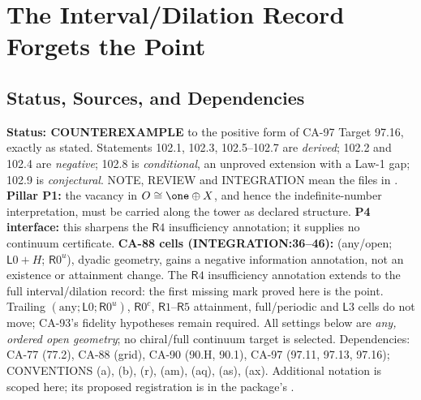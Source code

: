 \section{The Interval/Dilation Record Forgets the Point}\label{sec:record-forgets-the-point}

\subsection{Status, Sources, and Dependencies}

\textbf{Status: COUNTEREXAMPLE} to the positive form of CA-97 Target 97.16, exactly as stated.
Statements 102.1, 102.3, 102.5--102.7 are \emph{derived}; 102.2 and 102.4 are \emph{negative};
102.8 is \emph{conditional}, an unproved extension with a Law-1 gap; 102.9 is \emph{conjectural}.
NOTE, REVIEW and INTEGRATION mean the files in
.
\textbf{Pillar P1:} the vacancy in \(O\cong\one\oplus X\), and hence the indefinite-number interpretation,
must be carried along the tower as declared structure. \textbf{P4 interface:} this sharpens the
\(\mathsf R4\) insufficiency annotation; it supplies no continuum certificate.
\textbf{CA-88 cells (INTEGRATION:36--46):} (any/open; \(\mathsf L0+H\); \(\mathsf R0^u\)), dyadic geometry,
gains a negative information annotation, not an existence or attainment change. The \(\mathsf R4\)
insufficiency annotation extends to the full interval/dilation record: the first missing mark proved here
is the point. Trailing \((\mathrm{any};\mathsf L0;\mathsf R0^u)\), \(\mathsf R0^c\), \(\mathsf R1\)--\(\mathsf R5\)
attainment, full/periodic and \(\mathsf L3\) cells do not move; CA-93's fidelity hypotheses remain required.
All settings below are \emph{any, ordered open geometry}; no chiral/full continuum target is selected.
Dependencies: CA-77 (77.2), CA-88 (grid), CA-90 (90.H, 90.1), CA-97 (97.11, 97.13, 97.16);
CONVENTIONS (a), (b), (r), (am), (aq), (as), (ax). Additional notation is scoped here;
its proposed registration is in the package's .

